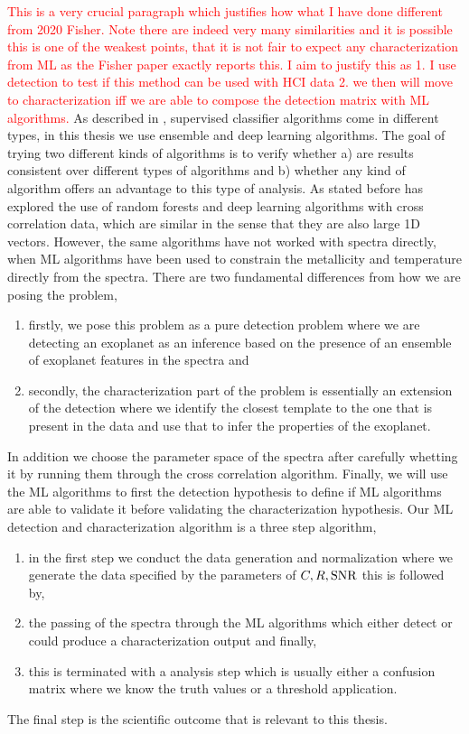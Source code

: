 \textcolor{red}{This is a very crucial paragraph which justifies how what I have done different from 2020 Fisher.
Note there are indeed very many similarities and it is possible this is one of the weakest points, that it is not fair to expect any characterization from ML as the Fisher paper exactly reports this.
I aim to justify this as 1. I use detection to test if this method can be used with HCI data 2. we then will move to characterization iff we are able to compose the detection matrix with ML algorithms.}
As described in , supervised classifier algorithms come in different types, in this thesis we use ensemble and deep learning algorithms.
The goal of trying two different kinds of algorithms is to verify whether a) are results consistent over different types of algorithms and b) whether any kind of algorithm offers an advantage to this type of analysis.
As stated before \cite{2020Fisher} has explored the use of random forests and deep learning algorithms with cross correlation data, which are similar in the sense that they are also large 1D vectors.
However, the same algorithms have not worked with spectra directly, when ML algorithms have been used to constrain the metallicity and temperature directly from the spectra.
There are two fundamental differences from how we are posing the problem,
\begin{enumerate}
    \item firstly, we pose this problem as a pure detection problem where we are detecting an exoplanet as an inference based on the presence of an ensemble of exoplanet features in the spectra and
    \item secondly, the characterization part of the problem is essentially an extension of the detection where we identify the closest template to the one that is present in the data and use that to infer the properties of the exoplanet.
    \end{enumerate}
    In addition we choose the parameter space of the spectra after carefully whetting it by running them through the cross correlation algorithm. Finally, we will use the ML algorithms to first the detection hypothesis to define if ML algorithms are able to validate it before validating the characterization hypothesis.
Our ML detection and characterization algorithm is a three step algorithm,
\begin{enumerate}
    \item in the first step we conduct the data generation and normalization where we generate the data specified by the parameters of $C,R,\rm{SNR}$ this is followed by,
    \item the passing of the spectra through the ML algorithms which either detect or could produce a characterization output and finally,
    \item this is terminated with a analysis step which is usually either a confusion matrix where we know the truth values or a threshold application.
\end{enumerate}
The final step is the scientific outcome that is relevant to this thesis.
